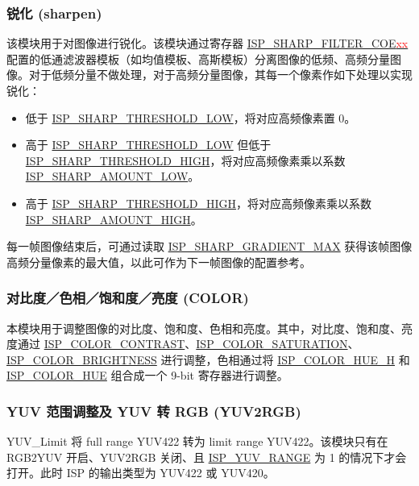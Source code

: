 \documentclass[main\_\_CN.tex]{subfiles}
\begin{document}
\subsubsection{锐化 (sharpen)}
\label{sec:isp_sharpen}
该模块用于对图像进行锐化。该模块通过寄存器 \hyperref[fielddesc:ISPSHARPFILTERCOE00]{ISP\_SHARP\_FILTER\_COE\textcolor{red}{xx}} 配置的低通滤波器模板（如均值模板、高斯模板）分离图像的低频、高频分量图像。对于低频分量不做处理，对于高频分量图像，其每一个像素作如下处理以实现锐化：
\begin{itemize}
    \item 低于 \hyperref[fielddesc:ISPSHARPTHRESHOLDLOW]{ISP\_SHARP\_THRESHOLD\_LOW}，将对应高频像素置 0。
    \item 高于 \hyperref[fielddesc:ISPSHARPTHRESHOLDLOW]{ISP\_SHARP\_THRESHOLD\_LOW} 但低于 \hyperref[fielddesc:ISPSHARPTHRESHOLDHIGH]{ISP\_SHARP\_THRESHOLD\_HIGH}，将对应高频像素乘以系数 \hyperref[fielddesc:ISPSHARPAMOUNTLOW]{ISP\_SHARP\_AMOUNT\_LOW}。
    \item 高于 \hyperref[fielddesc:ISPSHARPTHRESHOLDHIGH]{ISP\_SHARP\_THRESHOLD\_HIGH}，将对应高频像素乘以系数 \hyperref[fielddesc:ISPSHARPAMOUNTHIGH]{ISP\_SHARP\_AMOUNT\_HIGH}。
\end{itemize}

每一帧图像结束后，可通过读取 \hyperref[fielddesc:ISPSHARPGRADIENTMAX]{ISP\_SHARP\_GRADIENT\_MAX} 获得该帧图像高频分量像素的最大值，以此可作为下一帧图像的配置参考。


\subsubsection{对比度／色相／饱和度／亮度 (COLOR)}
本模块用于调整图像的对比度、饱和度、色相和亮度。其中，对比度、饱和度、亮度通过 \hyperref[fielddesc:ISPCOLORCONTRAST]{ISP\_COLOR\_CONTRAST}、\hyperref[fielddesc:ISPCOLORSATURATION]{ISP\_COLOR\_SATURATION}、\hyperref[fielddesc:ISPCOLORBRIGHTNESS]{ISP\_COLOR\_BRIGHTNESS} 进行调整，色相通过将 \hyperref[fielddesc:ISPCOLORHUEH]{ISP\_COLOR\_HUE\_H} 和 \hyperref[fielddesc:ISPCOLORHUE]{ISP\_COLOR\_HUE} 组合成一个 9-bit 寄存器进行调整。


\subsubsection{YUV 范围调整及 YUV 转 RGB (YUV2RGB)}
\label{sec:isp_yuv2rgb}
YUV\_Limit 将 full range YUV422 转为 limit range YUV422。该模块只有在 RGB2YUV 开启、YUV2RGB 关闭、且 \hyperref[fielddesc:ISPYUVRANGE]{ISP\_YUV\_RANGE} 为 1 的情况下才会打开。此时 ISP 的输出类型为 YUV422 或 YUV420。
\end{document}
